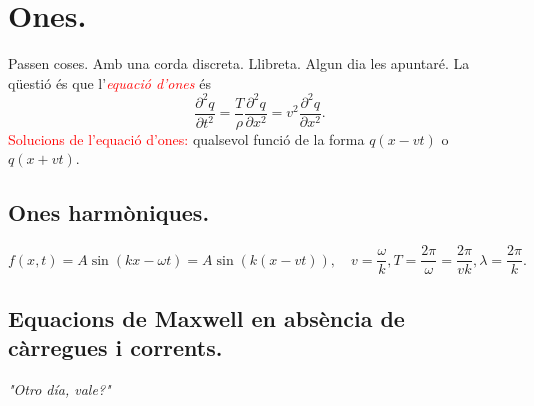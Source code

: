 \section{Ones.}
Passen coses. Amb una corda discreta. Llibreta. Algun dia les apuntaré. La qüestió és que l'\textcolor{red}{\textit{equació d'ones}} és
\[
\boxed{
	\dfrac{\partial^2q}{\partial t^2}=\dfrac{T}{\rho}\dfrac{\partial^2q}{\partial x^2}=v^2\dfrac{\partial^2q}{\partial x^2}.
}
\]
\textcolor{red}{Solucions de l'equació d'ones:} qualsevol funció de la forma $q(x-vt)$ o $q(x+vt)$.
\subsection{Ones harmòniques.}
\[
f(x,t)=A\sin(kx-\omega t)=A\sin(k(x-vt)),\quad v=\dfrac{\omega}{k},T=\dfrac{2\pi}{\omega}=\dfrac{2\pi}{vk},\lambda=\dfrac{2\pi}{k}.
\]
\subsection{Equacions de Maxwell en absència de càrregues i corrents.}
\textit{"Otro día, vale?"}